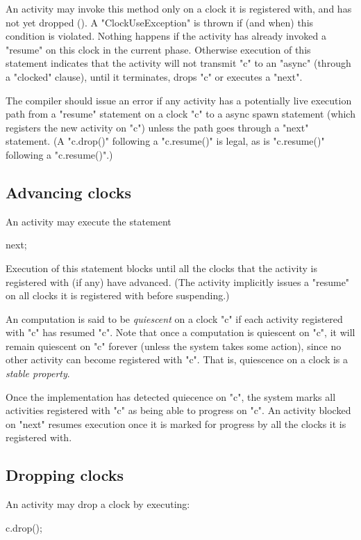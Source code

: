 An activity may invoke this method only on a clock it is registered
with, and has not yet dropped (). A \xcd"ClockUseException" is thrown if (and
when) this condition is violated.  Nothing happens if the activity has
already invoked a \xcd"resume" on this clock in the current phase.
Otherwise execution of this statement indicates that the activity will
not transmit \xcd"c" to an \xcd"async" (through a \xcd"clocked"
clause),
until it terminates, drops \xcd"c" or executes a \xcd"next". 

\begin{staticrule*}
The compiler should issue an error if any activity has a potentially
live execution path from a \xcd"resume" statement on a clock \xcd"c"
to a
async spawn statement (which registers the new
activity on \xcd"c") unless the path goes through a \xcd"next"
statement. (A \xcd"c.drop()" following a \xcd"c.resume()" is legal,
as is \xcd"c.resume()" following a \xcd"c.resume()".)
\end{staticrule*}

\subsection{Advancing clocks}\label{sec:clock:next}
An activity may execute the statement
\begin{xten}
next;
\end{xten}

\noindent 
Execution of this statement blocks until all the clocks that the
activity is registered with (if any) have advanced. (The activity
implicitly issues a \xcd"resume" on all clocks it is registered
with before suspending.)

An \Xten{} computation is said to be {\em quiescent} on a clock
\xcd"c" if each activity registered with \xcd"c" has resumed \xcd"c".
Note that once a computation is quiescent on \xcd"c", it will remain
quiescent on \xcd"c" forever (unless the system takes some action),
since no other activity can become registered with \xcd"c".  That is,
quiescence on a clock is a {\em stable property}.

Once the implementation has detected quiecence on \xcd"c", the system
marks all activities registered with \xcd"c" as being able to progress
on \xcd"c". An activity blocked on \xcd"next" resumes execution once
it is marked for progress by all the clocks it is registered with.

\subsection{Dropping clocks}\label{sec:clock:drop}
An activity may drop a clock by executing:
\begin{xten}
c.drop();
\end{xten}

